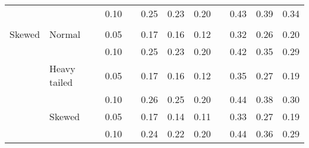 \begin{table}[ht]
\begin{scriptsize}
\begin{center}
\begin{tabular}{ll p{.1cm} c p{.1cm} rrr p{.1cm} rrr}
             &              && 0.10 &&  0.25 & 0.23 & 0.20 && 0.43 & 0.39 & 0.34 \\ 
             &&&&&&&&&&&\\
Skewed       & Normal       && 0.05 &&  0.17 & 0.16 & 0.12 && 0.32 & 0.26 & 0.20 \\ 
             &              && 0.10 &&  0.25 & 0.23 & 0.20 && 0.42 & 0.35 & 0.29 \\ 
             & Heavy tailed && 0.05 &&  0.17 & 0.16 & 0.12 && 0.35 & 0.27 & 0.19 \\ 
             &              && 0.10 &&  0.26 & 0.25 & 0.20 && 0.44 & 0.38 & 0.30 \\ 
             & Skewed       && 0.05 &&  0.17 & 0.14 & 0.11 && 0.33 & 0.27 & 0.19 \\ 
             &              && 0.10 &&  0.24 & 0.22 & 0.20 && 0.44 & 0.36 & 0.29 \\ 

\hline
\end{tabular}
\end{center}
\end{scriptsize}
\end{table}

